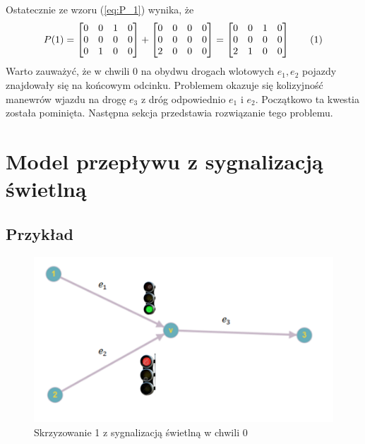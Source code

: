 \documentclass[12pt]{book}
\theoremstyle{plain}
\newcommand\addtag{\refstepcounter{equation}
\renewcommand{\labelenumii}{\theenumii}
\renewcommand{\theenumii}{\theenumi.\arabic{enumii}.}
\tag{\theequation}}
\begin{document}
Ostatecznie ze wzoru (\ref{eq:P_1}) wynika, że
 \[P(1)=\begin{bmatrix}
 0 & 0 & 1 & 0\\
 0 & 0 & 0 & 0\\
 0 & 1 & 0 & 0\\
 \end{bmatrix}+
 \begin{bmatrix}
 0 & 0 & 0 & 0\\
 0 & 0 & 0 & 0\\
 2 & 0 & 0 & 0\\
 \end{bmatrix}=
  \begin{bmatrix}
 0 & 0 & 1 & 0\\
 0 & 0 & 0 & 0\\
 2 & 1 & 0 & 0\\
 \end{bmatrix} \addtag
 \]
Warto zauważyć, że w chwili 0 na obydwu drogach wlotowych $e_1,e_2$ pojazdy znajdowały się na końcowym odcinku. Problemem okazuje się kolizyjność manewrów wjazdu na drogę $e_3$ z dróg odpowiednio $e_1$ i $e_2$. Początkowo ta kwestia została pominięta. Następna sekcja przedstawia rozwiązanie tego problemu.
\section{Model przepływu z sygnalizacją świetlną}
\subsection{Przykład}
\begin{figure}[H]
  \centering
    \includegraphics[width=14cm]{skrz_1_sygnalizacja}
 \caption{Skrzyzowanie 1 z sygnalizacją świetlną w chwili 0}
 \label{fig:skrz_1_sygnalizacja}
\end{figure}
\end{document}
